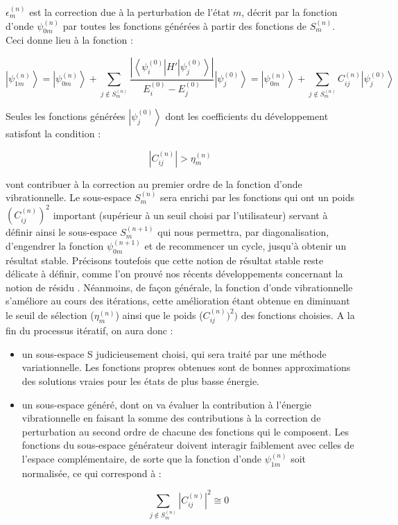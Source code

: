 $\epsilon^{(n)}_{m}$ est la correction due à la perturbation de l'état $m$, décrit par la fonction d'onde $\psi^{(n)}_{0m}$ par toutes les fonctions générées à partir des fonctions de $S^{(n)}_{m}$.
Ceci donne lieu à la fonction :


\begin{equation}
\left| \psi^{(n)}_{1m} \right\rangle  =  \left| \psi^{(n)}_{0m} \right\rangle + \sum_{j \notin  S^{(n)}_{m}}  \frac{| \left\langle \psi^{(0)}_{i} \right| H' \left| \psi^{(0)}_{j} \right\rangle |} {E^{(0)}_{i} - E^{(0)}_{j}}  \left| \psi^{(0)}_{j} \right\rangle = \left| \psi^{(n)}_{0m} \right\rangle  + \sum_{j \notin  S^{(n)}_{m}} C_{ij}^{(n)} \left| \psi^{(0)}_{j} \right\rangle
\end{equation}

Seules les fonctions générées $\left \vert \psi^{(0)}_{j} \right \rangle$ dont les coefficients du développement satisfont la condition :


\begin{equation}
\left| C_{ij}^{(n)} \right| > \eta^{(n)}_{m}
\end{equation}

vont contribuer à la correction au premier ordre de la fonction d'onde vibrationnelle. Le sous-espace $S^{(n)}_{m}$ sera enrichi par les fonctions qui ont un poids $(C_{ij}^{(n)})^2$ important (supérieur à un seuil choisi par l'utilisateur) servant à définir ainsi le sous-espace $S^{(n+1)}_{m}$ qui nous permettra, par diagonalisation, d'engendrer la fonction $\psi^{(n+1)}_{0m}$ et de recommencer un cycle, jusqu'à obtenir un résultat stable. Précisons toutefois que cette notion de \og résultat stable \fg{} reste délicate à définir, comme l'on prouvé nos récents développements concernant la notion de résidu \cite{garnier2016adaptive}. Néanmoins, de façon générale, la fonction d'onde vibrationnelle s'améliore au cours des itérations, cette amélioration étant obtenue en diminuant le seuil de sélection ($\eta^{(n)}_{m}$) ainsi que le poids ($C_{ij}^{(n)})^2)$ des fonctions choisies. A la fin du processus itératif, on aura donc :
\begin{itemize}
\item un sous-espace S judicieusement choisi, qui sera traité par une méthode variationnelle. Les fonctions propres obtenues sont de bonnes approximations des solutions vraies pour les états de plus basse énergie.
\item un sous-espace généré, dont on va évaluer la contribution à l'énergie vibrationnelle en faisant la somme des contributions à la correction de perturbation au second ordre de chacune des fonctions qui le composent. Les fonctions du sous-espace générateur doivent interagir faiblement avec celles de l'espace complémentaire, de sorte que la fonction d'onde $\psi^{(n)}_{1m}$ soit normalisée, ce qui correspond à :

\begin{equation}
\sum_{j \notin  S^{(n)}_{m}}  \left| C_{ij}^{(n)} \right|^2  \cong 0
\end{equation}
\end{itemize}



	
	